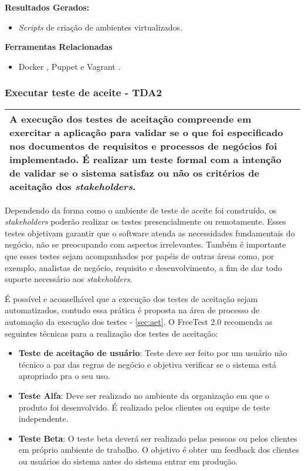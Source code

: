\textbf{Resultados Gerados: }
\begin{itemize}
    \item  \textit{Scripts} de criação de ambientes virtualizados.
\end{itemize}

\textbf{Ferramentas Relacionadas }
\begin{itemize}
    \item Docker \cite{Docker}, Puppet \cite{Puppet} e Vagrant \cite{Vagrant}.
\end{itemize}

\subsubsection{Executar teste de aceite - TDA2}
\label{sec:tda2}

\begin{table}[H]
\centering
\begin{tabular}{|p{130mm}|}
\hline
A execução dos testes de aceitação compreende em exercitar a aplicação para validar se o que foi especificado nos documentos de requisitos e processos de negócios foi implementado. É realizar um teste formal com a intenção de validar se o sistema satisfaz ou não os critérios de aceitação dos \textit{stakeholders}. \\ 
\hline
\end{tabular}
\end{table}

Dependendo da forma como o ambiente de teste de aceite foi construído, os \textit{stakeholders} poderão realizar os testes presencialmente ou remotamente. Esses testes objetivam garantir que o software atenda as necessidades fundamentais do negócio, não se preocupando com aspectos irrelevantes. Também é importante que esses testes sejam acompanhados por papéis de outras áreas como, por exemplo, analistas de negócio, requisito e desenvolvimento, a fim de dar todo suporte necessário aos \textit{stakeholders}.

É possível e aconselhável que a execução dos testes de aceitação sejam automatizados, contudo essa prática é proposta na área de processo de automação da execução dos testes - \ref{sec:aet}. O FreeTest 2.0 recomenda as seguintes técnicas para a realização dos testes de aceitação: 

\begin{itemize}
    \item \textbf{Teste de aceitação de usuário}: Teste deve ser feito por um usuário não técnico a par das regras de negócio e objetiva verificar se o sistema está apropriado pra o seu uso.
    \item \textbf{Teste Alfa}: Deve ser realizado no ambiente da organização em que o produto foi desenvolvido. É realizado pelos clientes ou equipe de teste independente.
    \item \textbf{Teste Beta}: O teste beta deverá ser realizado pelas pessoas ou pelos clientes em próprio ambiente de trabalho. O objetivo é obter um feedback dos clientes ou usuários do sistema antes do sistema entrar em produção.
\end{itemize}

